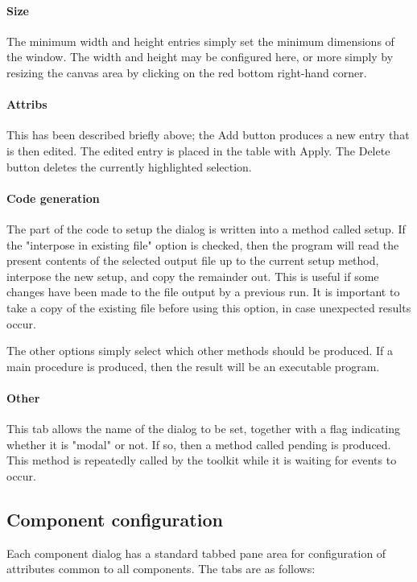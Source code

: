 \paragraph{Size}
The minimum width and height entries simply set the minimum dimensions
of the window. The width and height may be configured here, or more
simply by resizing the canvas area by clicking on the red bottom
right-hand corner.

\paragraph{Attribs}
This has been described briefly above; the Add button produces a new
entry that is then edited. The edited entry is placed in the table with
Apply. The Delete button deletes the currently highlighted selection.

\paragraph{Code generation}
The part of the code to setup the dialog is written into a method called
setup. If the "interpose in existing file"
option is checked, then the program will read the present contents of
the selected output file up to the current setup method, interpose the
new setup, and copy the remainder out. This is useful if some changes
have been made to the file output by a previous run. It is
important to take a copy of the existing file before using this option,
in case unexpected results occur.

The other options simply select which other methods should be produced.
If a main procedure is produced, then the result will be an executable
program.

\paragraph{Other}
This tab allows the name of the dialog to be set, together with a flag
indicating whether it is "modal" or not. If
so, then a method called pending is produced. This method is repeatedly
called by the toolkit while it is waiting for events to occur.


\subsection{Component configuration}

Each component dialog has a standard tabbed pane area for configuration
of attributes common to all components. The tabs are as follows:

